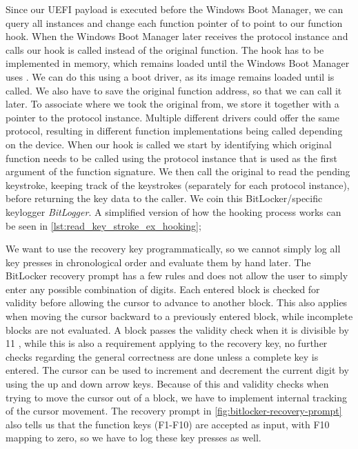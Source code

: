 Since our \ac{UEFI} payload is executed before the Windows Boot Manager, we can query all  instances and change each function pointer of  to point to our function hook.
When the Windows Boot Manager later receives the protocol instance and calls  our hook is called instead of the original function.
The hook has to be implemented in memory, which remains loaded until the Windows Boot Manager uses .
We can do this using a boot driver, as its image remains loaded until  is called.
We also have to save the original function address, so that we can call it later.
To associate where we took the original from, we store it together with a pointer to the protocol instance.
Multiple different drivers could offer the same protocol, resulting in different function implementations being called depending on the device.
When our hook is called we start by identifying which original function needs to be called using the protocol instance that is used as the first argument of the  function signature.
We then call the original to read the pending keystroke, keeping track of the keystrokes (separately for each protocol instance), before returning the key data to the caller.
We coin this BitLocker\-/specific keylogger \emph{BitLogger}.
A simplified version of how the hooking process works can be seen in \autoref{lst:read_key_stroke_ex_hooking};

\vspace{1em}



We want to use the recovery key programmatically, so we cannot simply log all key presses in chronological order and evaluate them by hand later.
The BitLocker recovery prompt has a few rules and does not allow the user to simply enter any possible combination of digits.
Each entered block is checked for validity before allowing the cursor to advance to another block.
This also applies when moving the cursor backward to a previously entered block, while incomplete blocks are not evaluated.
A block passes the validity check when it is divisible by 11 \cite[Section 9]{windows-internals-6-part2}, while this is also a requirement applying to the recovery key, no further checks regarding the general correctness are done unless a complete key is entered.
The cursor can be used to increment and decrement the current digit by using the up and down arrow keys.
Because of this and validity checks when trying to move the cursor out of a block, we have to implement internal tracking of the cursor movement.
The recovery prompt in \autoref{fig:bitlocker-recovery-prompt} also tells us that the function keys (F1-F10) are accepted as input, with F10 mapping to zero, so we have to log these key presses as well.

